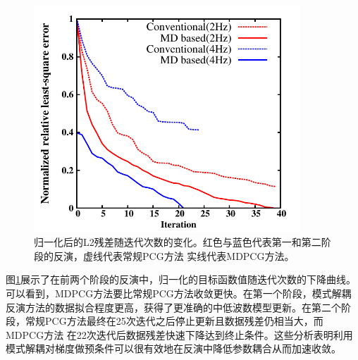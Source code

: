 \begin{figure}[!htb]
    \begin{center}
        \includegraphics[width=10cm]{Figure/chapter02/tariqsugresult/Fig/L2.pdf}
        \caption{
			归一化后的L2残差随迭代次数的变化。红色与蓝色代表第一和第二阶段的反演，虚线代表常规PCG方法
			实线代表MDPCG方法。
    }
    \label{fig:L2}
    \end{center}
\end{figure}
图\ref{fig:L2}展示了在前两个阶段的反演中，归一化的目标函数值随迭代次数的下降曲线。可以看到，MDPCG方法要比常规PCG方法收敛更快。在第一个阶段，模式解耦
反演方法的数据拟合程度更高，获得了更准确的中低波数模型更新。在第二个阶段，常规PCG方法最终在25次迭代之后停止更新且数据残差仍相当大，而MDPCG方法
在22次迭代后数据残差快速下降达到终止条件。这些分析表明利用模式解耦对梯度做预条件可以很有效地在反演中降低参数耦合从而加速收敛。
